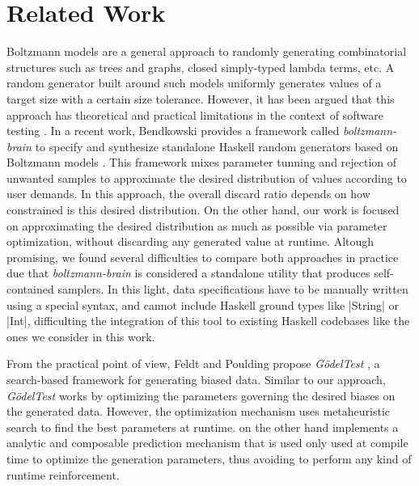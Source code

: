 \section{Related Work}


%
%
Boltzmann models \cite{Duchon2004} are a general approach to randomly generating
combinatorial structures such as trees and graphs, closed simply-typed lambda
terms, etc.
%
A random generator built around such models uniformly generates values of a
target size with a certain size tolerance.
%
However, it has been argued that this approach has theoretical and practical
limitations in the context of software testing \cite{feldt2013}.
%
In a recent work, Bendkowski provides a framework called \emph{boltzmann-brain}
to specify and synthesize standalone Haskell random generators based on
Boltzmann models \cite{bendkowski2018}.
%
This framework mixes parameter tunning and rejection of unwanted samples to
approximate the desired distribution of values according to user demands.
%
In this approach, the overall discard ratio depends on how constrained is this
desired distribution.
%
On the other hand, our work is focused on approximating the desired distribution
as much as possible via parameter optimization, without discarding any generated
value at runtime.
%
Altough promising, we found several difficulties to compare both approaches in
practice due that \emph{boltzmann-brain} is considered a standalone utility that
produces self-contained samplers.
%
In this light, data specifications have to be manually written using a special
syntax, and cannot include Haskell ground types like |String| or |Int|,
difficulting the integration of this tool to existing Haskell codebases like the
ones we consider in this work.



%
%
From the practical point of view, Feldt and Poulding propose \emph{G\"odelTest}
\cite{feldt2013}, a search-based framework for generating biased data.
%
%
Similar to our approach, \emph{G\"odelTest} works by optimizing the parameters
governing the desired biases on the generated data.
%
However, the optimization mechanism uses metaheuristic search to find the best
parameters at runtime.
%
\dragenp on the other hand implements a analytic and composable prediction
mechanism that is used only used at compile time to optimize the generation
parameters, thus avoiding to perform any kind of runtime reinforcement.



